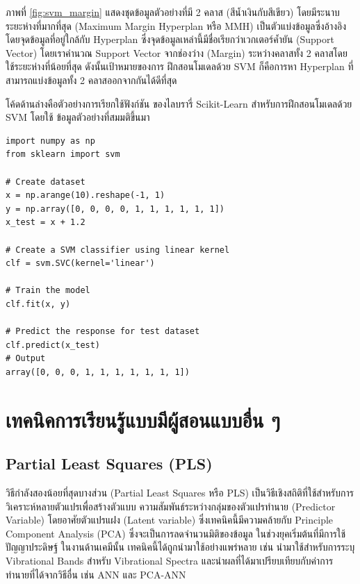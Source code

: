 ภาพที่ \ref{fig:svm_margin} แสดงชุดข้อมูลตัวอย่างที่มี 2 คลาส (สีน้ำเงินกับสีเขียว) โดยมีระนาบระยะห่างที่มากที่สุด (Maximum Margin
Hyperplan หรือ MMH) เป็นตัวแบ่งข้อมูลซึ่งอ้างอิงโดยจุดข้อมูลที่อยู่ใกล้กับ Hyperplan ซึ่งจุดข้อมูลเหล่านี้มีชื่อเรียกว่าเวกเตอร์ค้ำยัน (Support
Vector) โดยเราคำนวณ Support Vector จากช่องว่าง (Margin) ระหว่างคลาสทั้ง 2 คลาสโดยใช้ระยะห่างที่น้อยที่สุด ดังนั้นเป้าหมายของการ%
ฝึกสอนโมเดลด้วย SVM ก็คือการหา Hyperplan ที่สามารถแบ่งข้อมูลทั้ง 2 คลาสออกจากกันได้ดีที่สุด

โค้ดด้านล่างคือตัวอย่างการเรียกใช้ฟังก์ชัน  ของไลบรารี่ Scikit-Learn สำหรับการฝึกสอนโมเดลด้วย SVM โดยใช้%
ข้อมูลตัวอย่างที่สมมติขึ้นมา

\begin{lstlisting}[style=MyPython]
import numpy as np
from sklearn import svm

# Create dataset
x = np.arange(10).reshape(-1, 1)
y = np.array([0, 0, 0, 0, 1, 1, 1, 1, 1, 1])
x_test = x + 1.2

# Create a SVM classifier using linear kernel
clf = svm.SVC(kernel='linear')

# Train the model
clf.fit(x, y)

# Predict the response for test dataset
clf.predict(x_test)
# Output
array([0, 0, 0, 1, 1, 1, 1, 1, 1, 1])
\end{lstlisting}

\section{เทคนิคการเรียนรู้แบบมีผู้สอนแบบอื่น ๆ}
\label{sec:other_ml}

\subsection{Partial Least Squares (PLS)}
\label{ssec:pls}

วิธีกำลังสองน้อยที่สุดบางส่วน (Partial Least Squares หรือ PLS) เป็นวิธีเชิงสถิติที่ใช้สำหรับการวิเคราะห์หลายตัวแปรเพื่อสร้างตัวแบบ%
ความสัมพันธ์ระหว่างกลุ่มของตัวแปรทำนาย (Predictor Variable) โดยอาศัยตัวแปรแฝง (Latent variable) ซึ่งเทคนิคนี้มีความคล้ายกับ
Principle Component Analysis (PCA) ซึ่งจะเป็นการลดจำนวนมิติของข้อมูล\autocite{wold1984} ในช่วงยุคเริ่มต้นที่มีการใช้ปัญญาประดิษฐ์%
ในงานด้านเคมีนั้น เทคนิคนี้ได้ถูกนำมาใช้อย่างแพร่หลาย เช่น นำมาใช้สำหรับการระบุ Vibrational Bands สำหรับ Vibrational Spectra
และนำผลที่ได้มาเปรียบเทียบกับค่าการทำนายที่ได้จากวิธีอื่น เช่น ANN และ PCA-ANN

